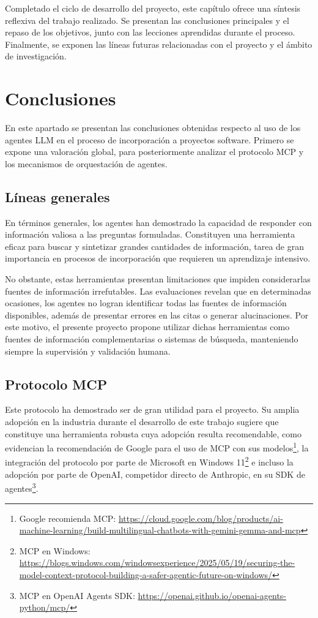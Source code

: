Completado el ciclo de desarrollo del proyecto, este capítulo ofrece una síntesis reflexiva del trabajo realizado. Se presentan las conclusiones principales y el repaso de los objetivos, junto con las lecciones aprendidas durante el proceso. Finalmente, se exponen las líneas futuras relacionadas con el proyecto y el ámbito de investigación.

\section{Conclusiones}
En este apartado se presentan las conclusiones obtenidas respecto al uso de los agentes LLM en el proceso de incorporación a proyectos software. Primero se expone una valoración global, para posteriormente analizar el protocolo MCP y los mecanismos de orquestación de agentes.

\subsection{Líneas generales}
En términos generales, los agentes han demostrado la capacidad de responder con información valiosa a las preguntas formuladas. Constituyen una herramienta eficaz para buscar y sintetizar grandes cantidades de información, tarea de gran importancia en procesos de incorporación que requieren un aprendizaje intensivo.

No obstante, estas herramientas presentan limitaciones que impiden considerarlas fuentes de información irrefutables. Las evaluaciones revelan que en determinadas ocasiones, los agentes no logran identificar todas las fuentes de información disponibles, además de presentar errores en las citas o generar alucinaciones. Por este motivo, el presente proyecto propone utilizar dichas herramientas como fuentes de información complementarias o sistemas de búsqueda, manteniendo siempre la supervisión y validación humana.

\subsection{Protocolo MCP}
Este protocolo ha demostrado ser de gran utilidad para el proyecto. Su amplia adopción en la industria durante el desarrollo de este trabajo sugiere que constituye una herramienta robusta cuya adopción resulta recomendable, como evidencian la recomendación de Google para el uso de MCP con sus modelos\footnote{Google recomienda MCP: \url{https://cloud.google.com/blog/products/ai-machine-learning/build-multilingual-chatbots-with-gemini-gemma-and-mcp}}, la integración del protocolo por parte de Microsoft en Windows 11\footnote{MCP en Windows: \url{https://blogs.windows.com/windowsexperience/2025/05/19/securing-the-model-context-protocol-building-a-safer-agentic-future-on-windows/}} e incluso la adopción por parte de OpenAI, competidor directo de Anthropic, en su SDK de agentes\footnote{MCP en OpenAI Agents SDK: \url{https://openai.github.io/openai-agents-python/mcp/}}.

